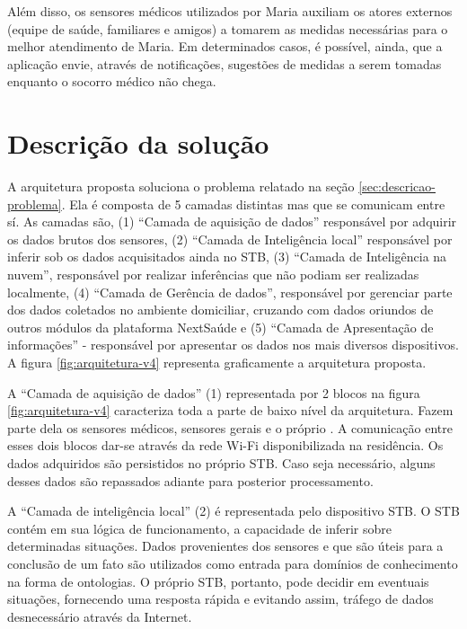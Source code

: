 Além disso, os sensores médicos utilizados por Maria auxiliam os atores
externos (equipe de saúde, familiares e amigos) a tomarem as medidas
necessárias para o melhor atendimento de Maria.  Em determinados casos, é
possível, ainda, que a aplicação envie, através de notificações, sugestões de
medidas a serem tomadas enquanto o socorro médico não chega.

\section{Descrição da solução}
\label{sec:descricao-solucao}

A arquitetura proposta soluciona o problema relatado na seção
\vref{sec:descricao-problema}. Ela é composta de 5 camadas distintas mas que se
comunicam entre sí. As camadas são, (1) ``Camada de aquisição de dados''
responsável por adquirir os dados brutos dos sensores, (2) ``Camada de
Inteligência local'' responsável por inferir sob os dados acquisitados ainda no
STB, (3) ``Camada de Inteligência na nuvem'', responsável por realizar
inferências que não podiam ser realizadas localmente, (4) ``Camada de Gerência
de dados'', responsável por gerenciar parte dos dados coletados no ambiente
domiciliar, cruzando com dados oriundos de outros módulos da plataforma
NextSaúde e (5) ``Camada de Apresentação de informações'' - responsável por
apresentar os dados nos mais diversos dispositivos. A figura
\ref{fig:arquitetura-v4} representa graficamente a arquitetura proposta.


A ``Camada de aquisição de dados'' (1) representada por 2 blocos na figura 
\ref{fig:arquitetura-v4} caracteriza toda a parte de baixo nível da
arquitetura. Fazem parte dela os sensores médicos, sensores gerais e o próprio
\stb[]. A comunicação entre esses dois blocos dar-se através da rede
Wi-Fi disponibilizada na residência. Os dados adquiridos são persistidos
no próprio STB. Caso seja necessário, alguns desses dados são repassados
adiante para posterior processamento. 

A ``Camada de inteligência local'' (2) é representada pelo dispositivo STB. 
O STB contém em sua lógica de funcionamento, a capacidade de inferir sobre
determinadas situações. Dados provenientes dos sensores e que são úteis para a 
conclusão de um fato são utilizados como entrada para domínios de conhecimento
na forma de ontologias. O próprio STB, portanto, pode decidir em eventuais
situações, fornecendo uma resposta rápida e evitando assim, tráfego de dados 
desnecessário através da Internet.

